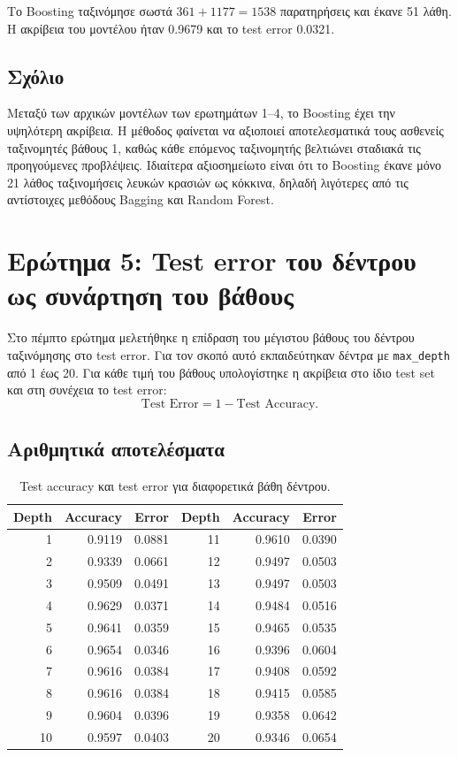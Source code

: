\documentclass[12pt,a4paper]{article}
\newcommand{\code}[1]{\texttt{\textenglish{#1}}}
\begin{document}
Το Boosting ταξινόμησε σωστά $361+1177=1538$ παρατηρήσεις και έκανε 51 λάθη.
Η ακρίβεια του μοντέλου ήταν 0.9679 και το test error 0.0321.

\subsection{Σχόλιο}

Μεταξύ των αρχικών μοντέλων των ερωτημάτων 1--4, το Boosting έχει την
υψηλότερη ακρίβεια. Η μέθοδος φαίνεται να αξιοποιεί αποτελεσματικά τους
ασθενείς ταξινομητές βάθους 1, καθώς κάθε επόμενος ταξινομητής βελτιώνει
σταδιακά τις προηγούμενες προβλέψεις. Ιδιαίτερα αξιοσημείωτο είναι ότι το
Boosting έκανε μόνο 21 λάθος ταξινομήσεις λευκών κρασιών ως κόκκινα, δηλαδή
λιγότερες από τις αντίστοιχες μεθόδους Bagging και Random Forest.

\section{Ερώτημα 5: Test error του δέντρου ως συνάρτηση του βάθους}

Στο πέμπτο ερώτημα μελετήθηκε η επίδραση του μέγιστου βάθους του δέντρου
ταξινόμησης στο test error. Για τον σκοπό αυτό εκπαιδεύτηκαν δέντρα με
\code{max\_depth} από 1 έως 20.
Για κάθε τιμή του βάθους υπολογίστηκε η ακρίβεια στο ίδιο test set και στη
συνέχεια το test error:
\[
    \text{Test Error} = 1 - \text{Test Accuracy}.
\]

\subsection{Αριθμητικά αποτελέσματα}

\begin{table}[H]
\centering
\caption{Test accuracy και test error για διαφορετικά βάθη δέντρου.}
\small
\begin{tabular}{rrr|rrr}
\toprule
\textbf{Depth} & \textbf{Accuracy} & \textbf{Error} &
\textbf{Depth} & \textbf{Accuracy} & \textbf{Error} \\
\midrule
1  & 0.9119 & 0.0881 & 11 & 0.9610 & 0.0390 \\
2  & 0.9339 & 0.0661 & 12 & 0.9497 & 0.0503 \\
3  & 0.9509 & 0.0491 & 13 & 0.9497 & 0.0503 \\
4  & 0.9629 & 0.0371 & 14 & 0.9484 & 0.0516 \\
5  & 0.9641 & 0.0359 & 15 & 0.9465 & 0.0535 \\
6  & 0.9654 & 0.0346 & 16 & 0.9396 & 0.0604 \\
7  & 0.9616 & 0.0384 & 17 & 0.9408 & 0.0592 \\
8  & 0.9616 & 0.0384 & 18 & 0.9415 & 0.0585 \\
9  & 0.9604 & 0.0396 & 19 & 0.9358 & 0.0642 \\
10 & 0.9597 & 0.0403 & 20 & 0.9346 & 0.0654 \\
\bottomrule
\end{tabular}
\end{table}
\end{document}
